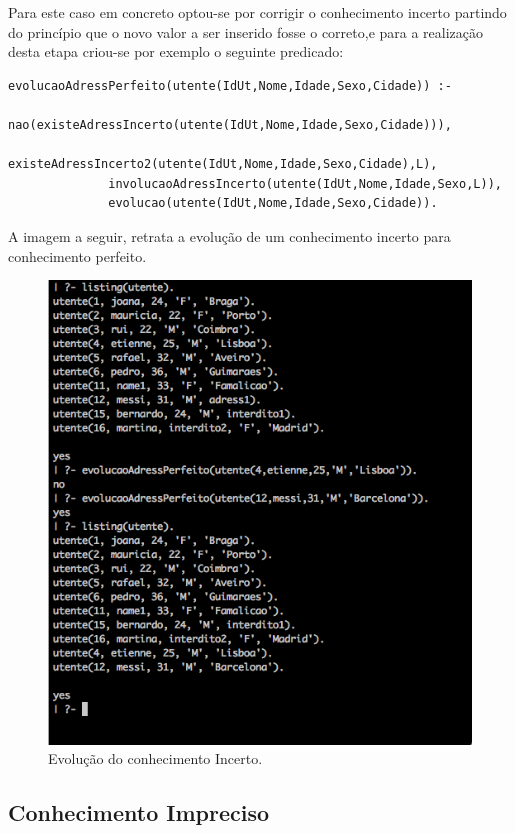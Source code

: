 \documentclass[25pt]{article}
\begin{document}
Para este caso em concreto optou-se por corrigir o conhecimento incerto partindo do princípio que o novo valor a ser inserido
fosse o correto,e para a realização desta etapa criou-se por exemplo o seguinte predicado:

\begin{lstlisting}
evolucaoAdressPerfeito(utente(IdUt,Nome,Idade,Sexo,Cidade)) :-
              nao(existeAdressIncerto(utente(IdUt,Nome,Idade,Sexo,Cidade))),
              existeAdressIncerto2(utente(IdUt,Nome,Idade,Sexo,Cidade),L),
              involucaoAdressIncerto(utente(IdUt,Nome,Idade,Sexo,L)),
              evolucao(utente(IdUt,Nome,Idade,Sexo,Cidade)). 
\end{lstlisting}

A imagem a seguir, retrata a evolução de um conhecimento incerto para conhecimento perfeito.

\begin{figure}[H]
\centering\includegraphics[scale=0.55]{pincerto}
\caption{\label{fig:controller} Evolução do conhecimento Incerto.}
\end{figure}


\subsection{Conhecimento Impreciso}
\end{document}
